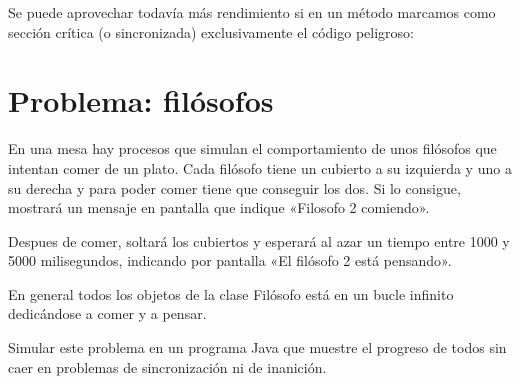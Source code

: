 \documentclass[letterpaper,10pt,spanish]{sphinxmanual}
\begin{document}
Se puede aprovechar todavía más rendimiento si en un método marcamos como sección crítica (o sincronizada) exclusivamente el código peligroso:

\begin{sphinxVerbatim}[commandchars=\\\{\}]
   
                 
\end{sphinxVerbatim}


\section{Problema: filósofos}
\label{\detokenize{textos/tema2:problema-filosofos}}
En una mesa hay procesos que simulan el comportamiento de unos filósofos que intentan comer de un plato. Cada filósofo tiene un cubierto a su izquierda y uno a su derecha y para poder comer tiene que conseguir los dos. Si lo consigue, mostrará un mensaje en pantalla que indique «Filosofo 2 comiendo».

Despues de comer, soltará los cubiertos y esperará al azar un tiempo entre 1000 y 5000 milisegundos, indicando por pantalla «El filósofo 2 está pensando».

En general todos los objetos de la clase Filósofo está en un bucle infinito dedicándose a comer y a pensar.

Simular este problema en un programa Java que muestre el progreso de todos sin caer en problemas de sincronización ni de inanición.
\end{document}
